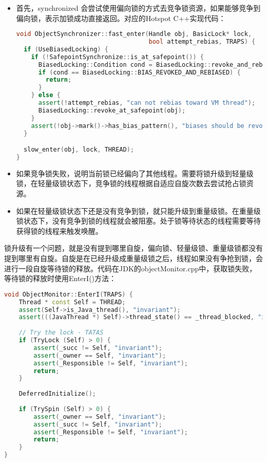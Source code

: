 \documentclass[../../../interview-questions.tex]{subfiles}
\begin{document}
\begin{itemize}
    \item {首先，synchronized 会尝试使用偏向锁的方式去竞争锁资源，如果能够竞争到偏向锁，表示加锁成功直接返回。}对应的Hotspot C++实现代码：
    
\begin{lstlisting}[language=C++]
void ObjectSynchronizer::fast_enter(Handle obj, BasicLock* lock,
                                    bool attempt_rebias, TRAPS) {
  if (UseBiasedLocking) {
    if (!SafepointSynchronize::is_at_safepoint()) {
      BiasedLocking::Condition cond = BiasedLocking::revoke_and_rebias(obj, attempt_rebias, THREAD);
      if (cond == BiasedLocking::BIAS_REVOKED_AND_REBIASED) {
        return;
      }
    } else {
      assert(!attempt_rebias, "can not rebias toward VM thread");
      BiasedLocking::revoke_at_safepoint(obj);
    }
    assert(!obj->mark()->has_bias_pattern(), "biases should be revoked by now");
  }

  slow_enter(obj, lock, THREAD);
}
\end{lstlisting}


    \item {如果竞争锁失败，说明当前锁已经偏向了其他线程。需要将锁升级到轻量级锁，在轻量级锁状态下，竞争锁的线程根据自适应自旋次数去尝试抢占锁资源。}
    \item {如果在轻量级锁状态下还是没有竞争到锁，就只能升级到重量级锁。在重量级锁状态下，没有竞争到锁的线程就会被阻塞。处于锁等待状态的线程需要等待获得锁的线程来触发唤醒。}
\end{itemize}

锁升级有一个问题，就是没有提到哪里自旋，偏向锁、轻量级锁、重量级锁都没有提到哪里有自旋。自旋是在已经升级成重量级锁之后，线程如果没有争抢到锁，会进行一段自旋等待锁的释放。代码在JDK的objectMonitor.cpp中，获取锁失败，等待锁的释放时使用EnterI()方法：

\begin{lstlisting}[language=C++]
void ObjectMonitor::EnterI(TRAPS) {
    Thread * const Self = THREAD;
    assert(Self->is_Java_thread(), "invariant");
    assert(((JavaThread *) Self)->thread_state() == _thread_blocked, "invariant");
    
    // Try the lock - TATAS
    if (TryLock (Self) > 0) {
        assert(_succ != Self, "invariant");
        assert(_owner == Self, "invariant");
        assert(_Responsible != Self, "invariant");
        return;
    }
    
    DeferredInitialize();
    
    if (TrySpin (Self) > 0) {
        assert(_owner == Self, "invariant");
        assert(_succ != Self, "invariant");
        assert(_Responsible != Self, "invariant");
        return;
    }
}      
\end{lstlisting}
\end{document}
